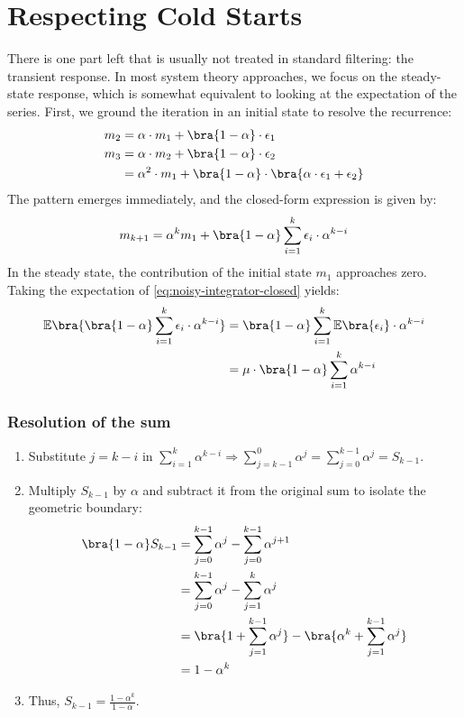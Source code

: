 \section{Respecting Cold Starts}
There is one part left that is usually not treated in standard filtering: the transient response. In most system theory approaches, we focus on the steady-state response, which is somewhat equivalent to looking at the expectation of the series. First, we ground the iteration in an initial state to resolve the recurrence:
\begin{align}
	m_2 &= \alpha\cdot m_1 + \bra{1-\alpha}\cdot\epsilon_1 \\
	m_3 &= \alpha\cdot m_2 + \bra{1-\alpha}\cdot\epsilon_2 \\
	&= \alpha^2\cdot m_1 + \bra{1-\alpha}\cdot\bra{\alpha\cdot\epsilon_1+\epsilon_2}
\end{align}
The pattern emerges immediately, and the closed-form expression is given by:
\begin{align}
	\label{eq:noisy-integrator-closed}
	m_{k+1} = \alpha^k m_1 + \bra{1-\alpha} \sum_{i=1}^k \epsilon_i \cdot \alpha^{k-i}
\end{align}
In the steady state, the contribution of the initial state $m_1$ approaches zero. Taking the expectation of \eqref{eq:noisy-integrator-closed} yields:
\begin{align}
	\label{eq:expected-noise}
	\mathbb{E}\bra{\bra{1-\alpha} \sum_{i=1}^k \epsilon_i \cdot \alpha^{k-i}} 
	&= \bra{1-\alpha} \sum_{i=1}^k \mathbb{E}\bra{\epsilon_i} \cdot \alpha^{k-i} \\
	&= \mu \cdot \bra{1-\alpha} \sum_{i=1}^k \alpha^{k-i}
\end{align}

\subsubsection{Resolution of the sum}
\begin{enumerate}
	\item Substitute $j=k-i$ in $\sum_{i=1}^k \alpha^{k-i} \Rightarrow \sum_{j=k-1}^0 \alpha^j = \sum_{j=0}^{k-1} \alpha^j = S_{k-1}$.
	\item Multiply $S_{k-1}$ by $\alpha$ and subtract it from the original sum to isolate the geometric boundary:
	\begin{align}
		\bra{1-\alpha} S_{k-1} &= \sum_{j=0}^{k-1} \alpha^j - \sum_{j=0}^{k-1} \alpha^{j+1} \\
		&= \sum_{j=0}^{k-1} \alpha^j - \sum_{j=1}^{k} \alpha^{j} \\
		&= \bra{1 + \sum_{j=1}^{k-1} \alpha^j} - \bra{\alpha^k + \sum_{j=1}^{k-1} \alpha^j} \\
		&= 1 - \alpha^k
	\end{align}
	\item Thus, $S_{k-1} = \frac{1-\alpha^k}{1-\alpha}$.
\end{enumerate}

